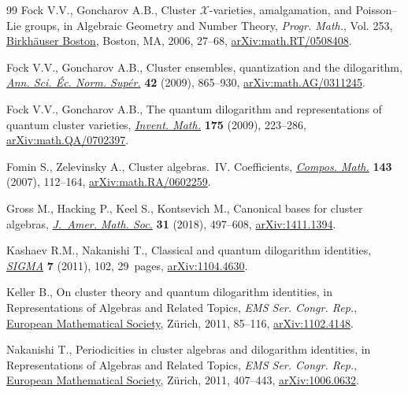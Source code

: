 \documentclass[11pt]{article}
\numberwithin{equation}{section}
\numberwithin{equation}{section}
\begin{document}
\begin{thebibliography}{99}
Fock V.V., Goncharov A.B., Cluster {$\mathcal{X}$}-varieties, amalgamation, and
 {P}oisson--{L}ie groups, in Algebraic {G}eometry and {N}umber {T}heory,
 \textit{Progr. Math.}, Vol. 253, \href{https://doi.org/10.1007/978-0-8176-4532-8_2}{Birkh\"auser Boston}, Boston, MA, 2006,
 27--68, \href{https://arxiv.org/abs/math.RT/0508408}{arXiv:math.RT/0508408}.

Fock V.V., Goncharov A.B., Cluster ensembles, quantization and the dilogarithm,
 \href{https://doi.org/10.24033/asens.2112}{\textit{Ann. Sci. \'Ec. Norm. Sup\'er.}} \textbf{42} (2009), 865--930,
 \href{https://arxiv.org/abs/math.AG/0311245}{arXiv:math.AG/0311245}.

Fock V.V., Goncharov A.B., The quantum dilogarithm and representations of
 quantum cluster varieties, \href{https://doi.org/10.1007/s00222-008-0149-3}{\textit{Invent. Math.}} \textbf{175} (2009),
 223--286, \href{https://arxiv.org/abs/math.QA/0702397}{arXiv:math.QA/0702397}.

Fomin S., Zelevinsky A., Cluster algebras.~{IV}. {C}oefficients,
 \href{https://doi.org/10.1112/S0010437X06002521}{\textit{Compos. Math.}} \textbf{143} (2007), 112--164,
 \href{https://arxiv.org/abs/math.RA/0602259}{arXiv:math.RA/0602259}.

Gross M., Hacking P., Keel S., Kontsevich M., Canonical bases for cluster
 algebras, \href{https://doi.org/10.1090/jams/890}{\textit{J.~Amer. Math. Soc.}} \textbf{31} (2018), 497--608,
 \href{https://arxiv.org/abs/1411.1394}{arXiv:1411.1394}.

Kashaev R.M., Nakanishi T., Classical and quantum dilogarithm identities,
 \href{https://doi.org/10.3842/SIGMA.2011.102}{\textit{SIGMA}} \textbf{7} (2011), 102, 29~pages, \href{https://arxiv.org/abs/1104.4630}{arXiv:1104.4630}.

Keller B., On cluster theory and quantum dilogarithm identities, in
 Representations of {A}lgebras and {R}elated {T}opics, \textit{EMS Ser. Congr. Rep.},
 \href{https://doi.org/10.4171/101-1/3}{European Mathematical Society}, Z\"urich, 2011, 85--116, \href{https://arxiv.org/abs/1102.4148}{arXiv:1102.4148}.

Nakanishi T., Periodicities in cluster algebras and dilogarithm identities, in
 Representations of {A}lgebras and {R}elated {T}opics, \textit{EMS Ser. Congr. Rep.},
 \href{https://doi.org/10.4171/101-1/9}{European Mathematical Society}, Z\"urich, 2011, 407--443, \href{https://arxiv.org/abs/1006.0632}{arXiv:1006.0632}.


\end{thebibliography}
\end{document}
